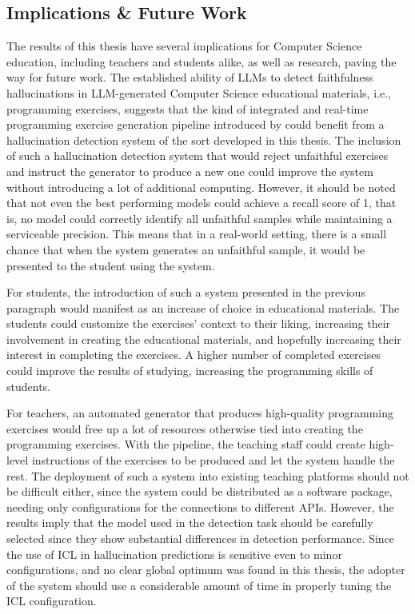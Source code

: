 \documentclass[english, 12pt, a4paper, sci, utf8, a-2b, online]{latex/definitions/aaltothesis}
\begin{document}
\subsection{Implications \& Future Work}

The results of this thesis have several implications for Computer Science education, including teachers and students alike, as well as research, paving the way for future work. The established ability of LLMs to detect faithfulness hallucinations in LLM-generated Computer Science educational materials, i.e., programming exercises, suggests that the kind of integrated and real-time programming exercise generation pipeline introduced by \textcite{10.1145/3632620.3671103} could benefit from a hallucination detection system of the sort developed in this thesis. The inclusion of such a hallucination detection system that would reject unfaithful exercises and instruct the generator to produce a new one could improve the system without introducing a lot of additional computing. However, it should be noted that not even the best performing models could achieve a recall score of 1, that is, no model could correctly identify all unfaithful samples while maintaining a serviceable precision. This means that in a real-world setting, there is a small chance that when the system generates an unfaithful sample, it would be presented to the student using the system.

For students, the introduction of such a system presented in the previous paragraph would manifest as an increase of choice in educational materials. The students could customize the exercises' context to their liking, increasing their involvement in creating the educational materials, and hopefully increasing their interest in completing the exercises. A higher number of completed exercises could improve the results of studying, increasing the programming skills of students.

For teachers, an automated generator that produces high-quality programming exercises would free up a lot of resources otherwise tied into creating the programming exercises. With the pipeline, the teaching staff could create high-level instructions of the exercises to be produced and let the system handle the rest. The deployment of such a system into existing teaching platforms should not be difficult either, since the system could be distributed as a software package, needing only configurations for the connections to different APIs. However, the results imply that the model used in the detection task should be carefully selected since they show substantial differences in detection performance. Since the use of ICL in hallucination predictions is sensitive even to minor configurations, and no clear global optimum was found in this thesis, the adopter of the system should use a considerable amount of time in properly tuning the ICL configuration.
\end{document}
